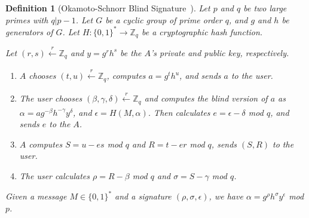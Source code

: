 \documentclass[conference]{IEEEtran}
\newtheorem{definition}{Definition}
\begin{document}
\begin{definition}[Okamoto-Schnorr Blind Signature~\cite{okamoto1992provably}]
Let $p$ and $q$ be two large primes with $q|p-1$. Let $G$ be a cyclic group of prime order $q$, and $g$ and $h$ be generators of $G$. Let $H:\{0,1\}^*\rightarrow \mathbb{Z}_q$ be a cryptographic hash function.
\begin{LaTeXdescription}
\item[Key Generation:] Let $(r,s) \xleftarrow[]{r}\mathbb{Z}_q$ and $y=g^rh^s$ be the $A$'s private and public key, respectively.
\item[Blind signature protocol:]
\begin{enumerate}
    \item $A$ chooses $(t,u) \xleftarrow[]{r}\mathbb{Z}_q$, computes $a = g^th^u$, and sends $a$ to the user.
    \item The user chooses $(\beta, \gamma, \delta) \xleftarrow[]{r}\mathbb{Z}_q$ and computes the blind version of $a$ as $\alpha=ag^{-\beta} h^{-\gamma} y^\delta$, and $\epsilon=H(M,\alpha)$. Then calculates $e=\epsilon-\delta$ mod $q$, and sends $e$ to the $A$.
    \item $A$ computes $S=u-es$ mod $q$ and $R=t-er$ mod $q$, sends $(S,R)$ to the user.
    \item The user calculates $\rho=R-\beta$ mod $q$ and $\sigma=S-\gamma$ mod $q$.
\end{enumerate}
\item[Verification:] Given a message $M\in \{0,1\}^*$ and a signature $(\rho,\sigma,\epsilon)$, we have $\alpha=g^\rho h^\sigma y^\epsilon$ mod $p$.
\end{LaTeXdescription}
\end{definition}
\end{document}
